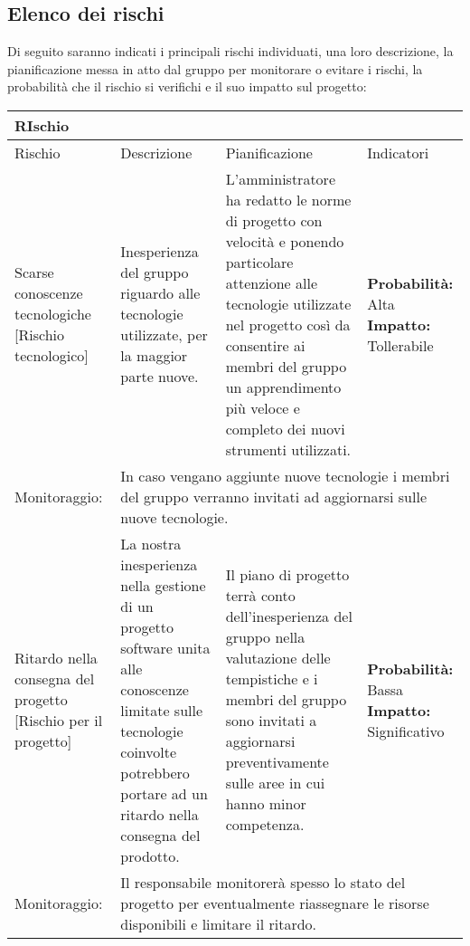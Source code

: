 \documentclass[../piano-di-progetto.tex]{subfiles}
\begin{document}
  \subsection{Elenco dei rischi}%
  \label{sub:elenco_dei_rischi}
  Di seguito saranno indicati i principali rischi individuati, una loro descrizione, la pianificazione messa in atto dal gruppo per monitorare o evitare i rischi, la probabilità che il rischio si verifichi e il suo impatto sul progetto:
      \renewcommand{\arraystretch}{2} %
      \begin{longtable}{|p{10em}|p{13em}|p{13em}|p{10em}|}
       \rowcolor{darkgray!90!}
      \color{white}
      {\textbf{RIschio}} & \color{white}{\textbf{Descrizione}} & \color{white}{\textbf{Pianificazione}} & \color{white}{\textbf{Indicatori}} \\
      \endhead
       \rowcolor{white}
    \multicolumn{3}{r}{\textit{Continua alla pagina seguente}}
    \endfoot
    \endlastfoot
  \hline
  Rischio & Descrizione & Pianificazione & Indicatori\\
  \hline
  \endhead
  Scarse conoscenze tecnologiche [Rischio tecnologico] & Inesperienza del gruppo riguardo alle tecnologie utilizzate, per la maggior parte nuove. & L'amministratore ha redatto le norme di progetto con velocità e ponendo particolare attenzione alle tecnologie utilizzate nel progetto così da consentire ai membri del gruppo un apprendimento più veloce e completo dei nuovi strumenti utilizzati. & \textbf{Probabilità:} Alta \textbf{Impatto:} Tollerabile \\
  Monitoraggio: & \multicolumn{3}{p{38.5em}|}{In caso vengano aggiunte nuove tecnologie i membri del gruppo verranno invitati ad aggiornarsi sulle nuove tecnologie.}\\
  \hline
  Ritardo nella consegna del progetto [Rischio per il progetto] & La nostra inesperienza nella gestione di un progetto software unita alle conoscenze limitate sulle tecnologie coinvolte potrebbero portare ad un ritardo nella consegna del prodotto. & Il piano di progetto terrà conto dell'inesperienza del gruppo nella valutazione delle tempistiche e i membri del gruppo sono invitati a aggiornarsi preventivamente sulle aree in cui hanno minor competenza. & \textbf{Probabilità:}   Bassa \textbf{Impatto: }  Significativo  \\
  Monitoraggio: & \multicolumn{3}{p{38.5em}|}{Il responsabile monitorerà spesso lo stato del progetto per eventualmente riassegnare le risorse disponibili e limitare il ritardo.}\\

\end{longtable}
\end{document}
